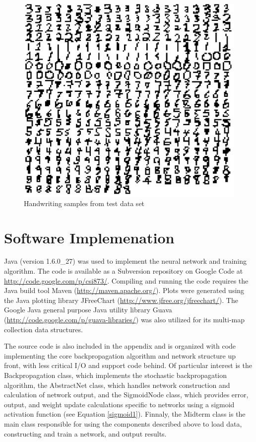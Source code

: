 \documentclass{article}
\begin{document}
\begin{figure}
\centering
\includegraphics[width=1.00\textwidth]{data/visualization/all_testing_data.png}
\caption{Handwriting samples from test data set}
\label{test_all}
\end{figure}

\section{Software Implemenation}\label{Software Implemenation}

Java (version 1.6.0\_27) was used to implement the neural network and training algorithm. The code is available as a Subversion repository on Google Code at \url{http://code.google.com/p/csi873/}. Compiling and running the code requires the Java build tool Maven (\url{http://maven.apache.org/}). Plots were generated using the Java plotting library JFreeChart (\url{http://www.jfree.org/jfreechart/}). The Google Java general purpose Java utility library Guava (\url{http://code.google.com/p/guava-libraries/}) was also utilized for its multi-map collection data structures.

The source code is also included in the appendix and is organized with code implementing the core backpropagation algorithm and network structure up front, with less critical I/O and support code behind. Of particular interest is the Backpropagation class, which implements the stochastic backpropagation algorithm, the AbstractNet class, which handles network construction and calculation of network output, and the SigmoidNode class, which provides error, output, and weight update calculations specific to networks using a sigmoid activation function (see Equation \ref{sigmoid1}). Finnaly, the Midterm class is the main class responsible for using the components described above to load data, constructing and train a network, and output results.
\end{document}
